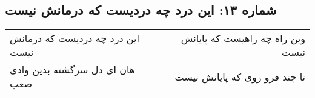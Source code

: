 \begin{center}
\section*{شماره ۱۳: این درد چه دردیست که درمانش نیست}
\label{sec:013}
\begin{longtable}{l p{0.5cm} r}
این درد چه دردیست که درمانش نیست
&&
وین راه چه راهیست که پایانش نیست
\\
هان ای دل سرگشته بدین وادی صعب
&&
تا چند فرو روی که پایانش نیست
\\
\end{longtable}
\end{center}
